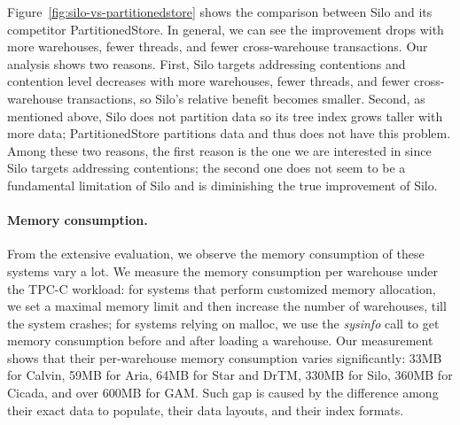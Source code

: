 





Figure~\ref{fig:silo-vs-partitionedstore} shows the comparison between
Silo and its competitor PartitionedStore. In general, we can see the improvement drops with more
warehouses, fewer threads, and fewer cross-warehouse transactions. Our analysis shows two reasons.
First, Silo targets addressing contentions and contention level decreases with more
warehouses, fewer threads, and fewer cross-warehouse transactions, so Silo's relative
benefit becomes smaller. Second, as mentioned above, Silo does not partition data so
its tree index grows taller with more data; PartitionedStore partitions data and thus
does not have this problem. Among these two reasons, the first reason is the one we are
interested in since Silo targets addressing contentions; the second one does not seem
to be a fundamental limitation of Silo and is diminishing the true improvement of Silo.

\vspace{-.1in}
\paragraph{Memory consumption.}
From the extensive evaluation, we observe the memory consumption of these
systems vary a lot. We measure the memory consumption
per warehouse under the TPC-C workload: for systems that perform customized
memory allocation, we set a maximal memory limit
and then increase the number of warehouses, till the system crashes; for systems
relying on malloc, we use the \emph{sysinfo} call to get memory consumption
before and after loading a warehouse. Our measurement shows that 
their per-warehouse memory consumption varies significantly: 33MB for Calvin, 59MB for Aria, 64MB for Star and DrTM,
330MB for Silo, 360MB for Cicada, and over 600MB for GAM.
Such gap
is caused by the difference among their exact data to populate, their
data layouts, and their index formats.

